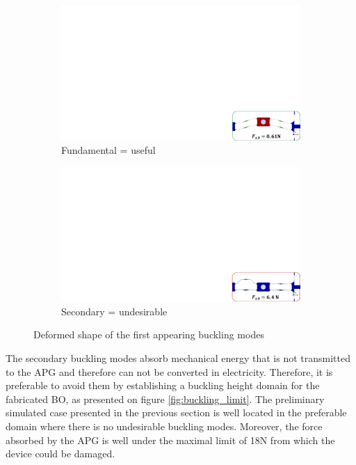 \documentclass[3p,twocolumn,preprint]{elsarticle}
\def \hfillx {\hspace*{ -\linewidth} \hfill} %
\begin{document}
\begin{figure}[!htb]
	\begin{center}
		\begin{subfigure}[t]{0.48\linewidth}
			\captionsetup{justification=centering}
			\includegraphics[trim={24.1cm 0cm 0cm 14.8cm},clip,width=\linewidth]{figures/buckling_fundamental.pdf}
			\caption{Fundamental = useful}
			\label{fig:buckling_fundamental}
		\end{subfigure}
		\hfillx
		\begin{subfigure}[t]{0.48\linewidth}
			\captionsetup{justification=centering}
			\includegraphics[trim={24.1cm 0cm 0cm 14.8cm},clip,width=\linewidth]{figures/buckling_secondary.pdf}
			\caption{Secondary = undesirable}
			\label{fig:buckling_secondary}
		\end{subfigure}
		\caption{Deformed shape of the first appearing buckling modes}
		\label{fig:Buckling_deformed_shapes}
	\end{center}
\end{figure}
The secondary buckling modes absorb mechanical energy that is not transmitted to the APG and therefore can not be converted in electricity. Therefore, it is preferable to avoid them by establishing a buckling height domain for the fabricated BO, as presented on figure \ref{fig:buckling_limit}. The preliminary simulated case presented in the previous section is well located in the preferable domain where there is no undesirable buckling modes. Moreover, the force absorbed by the APG is well under the maximal limit of 18N from which the device could be damaged.
\end{document}
